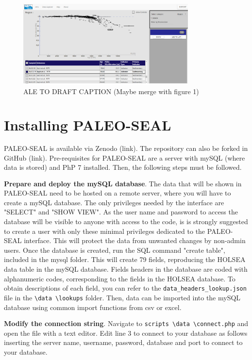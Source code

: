 \documentclass[a4paper,fleqn]{cas-dc}
\begin{document}
\begin{figure}
	\centering
	\includegraphics[width=0.8\textwidth]{figs/Figure2.png}
	\caption{ALE TO DRAFT CAPTION (Maybe merge with figure 1)}
	\label{fig:2}
\end{figure}

\section{Installing PALEO-SEAL}
PALEO-SEAL is available via Zenodo (link). The repository can also be forked in GitHub (link). Pre-requisites for PALEO-SEAL are a server with mySQL (where data is stored) and PhP 7 installed. Then, the following steps must be followed.

\textbf{Prepare and deploy the mySQL database}. The data that will be shown in PALEO-SEAL need to be hosted on a remote server, where you will have to create a mySQL database. The only privileges needed by the interface are "SELECT" and "SHOW VIEW". As the user name and password to access the database will be visible to anyone with access to the code, is is strongly suggested to create a user with only these minimal privileges dedicated to the PALEO-SEAL interface. This will protect the data from unwanted changes by non-admin users. Once the database is created, run the SQL command "create table", included in the mysql folder. This will create 79 fields, reproducing the HOLSEA data table in the mySQL database. Fields headers in the database are coded with alphanumeric codes, corresponding to the fields in the HOLSEA database. To obtain descriptions of each field, you can refer to the \texttt{data\_headers\_lookup.json} file in the \texttt{\textbackslash data \textbackslash lookups} folder. Then, data can be imported into the mySQL database using common import functions from csv or excel.

\textbf{Modify the connection string}. Navigate to \texttt{scripts \textbackslash data \textbackslash connect.php} and open the file with a text editor. Edit line 3 to connect to your database as follows inserting the server name, username, password, database and port to connect to your database.
\end{document}
